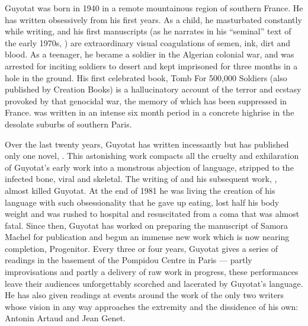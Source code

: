 \documentclass[10pt,twoside]{memoir}
\begin{document}
Guyotat was born in 1940 in a remote mountainous region of southern France. He has written obsessively from his first years. As a child, he masturbated constantly while writing, and his first manuscripts (as he narrates in his \enquote{seminal} text of the early 1970s, ) are extraordinary visual coagulations of semen, ink, dirt and blood. As a teenager, he became a soldier in the Algerian colonial war, and was arrested for inciting soldiers to desert and kept imprisoned for three months in a hole in the ground. His first celebrated book, Tomb For 500,000 Soldiers (also published by Creation Books) is a hallucinatory account of the terror and ecstasy provoked by that genocidal war, the memory of which has been suppressed in France.  was written in an intense six month period in a concrete highrise in the desolate suburbs of southern Paris.

Over the last twenty years, Guyotat has written incessantly but has published only one novel, . This astonishing work compacts all the cruelty and exhilaration of Guyotat's early work into a monstrous abjection of language, stripped to the infected bone, viral and skeletal. The writing of  and his subsequent work, , almost killed Guyotat. At the end of 1981 he was living the creation of his language with such obsessionality that he gave up eating, lost half his body weight and was rushed to hospital and resuscitated from a coma that was almost fatal. Since then, Guyotat has worked on preparing the manuscript of Samora Machel for publication and begun an immense new work which is now nearing completion, Progenitor. Every three or four years, Guyotat gives a series of readings in the basement of the Pompidou Centre in Paris --- partly improvisations and partly a delivery of raw work in progress, these performances leave their audiences unforgettably scorched and lacerated by Guyotat's language. He has also given readings at events around the work of the only two writers whose vision in any way approaches the extremity and the dissidence of his own: Antonin Artaud and Jean Genet.
\end{document}
